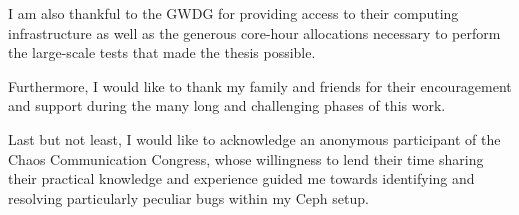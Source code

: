 I am also thankful to the \ac{GWDG} for providing access to their computing
infrastructure as well as the generous core-hour allocations necessary to
perform the large-scale tests that made the thesis possible.

Furthermore, I would like to thank my family and friends for their encouragement
and support during the many long and challenging phases of this work.

Last but not least, I would like to acknowledge an anonymous participant of the
Chaos Communication Congress, whose willingness to lend their time sharing their
practical knowledge and experience guided me towards identifying and resolving
particularly peculiar bugs within my Ceph setup.

\newpage
\pagestyle{plain}
\clearpage


\thispagestyle{plain}
\newpage

\tableofcontents

\newpage
\clearpage{}
\listoftables
\newpage
\clearpage
{}
\listoffigures
\newpage
\clearpage
{}
\listoflistings {}
\newpage


\hypersetup{pageanchor=true}
\setcounter{page}{1}
\pagestyle{fancy}




\newpage
\printbibliography[heading=bibintoc]

\appendix
\break

\renewcommand*{\thepage}{A\arabic{page}}

\newpage




